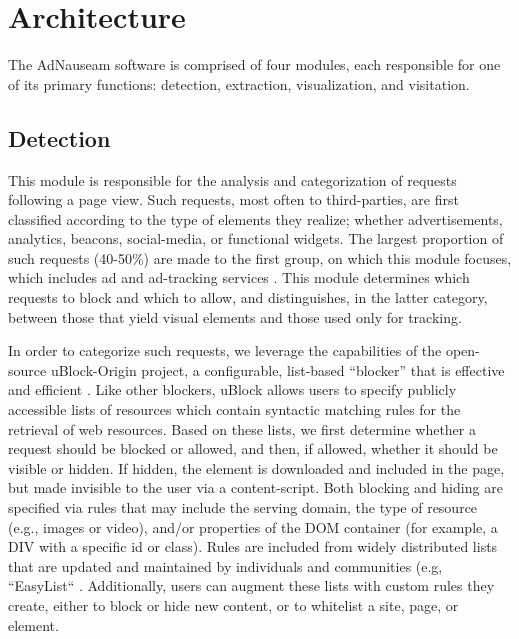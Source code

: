\documentclass[conference]{IEEEtran}
\begin{document}
\section{Architecture}

The AdNauseam software is comprised of four modules, each responsible for one of its primary functions: detection, extraction, visualization, and visitation.

\subsection{Detection}

This module is responsible for the analysis and categorization of requests following a page view. Such requests, most often to third-parties, are first classified according to the type of elements they realize; whether advertisements, analytics, beacons, social-media, or functional widgets. The largest proportion of such requests (40-50\%) are made to the first group, on which this module focuses, which includes ad and ad-tracking services \cite{Wills}. This module determines which requests to block and which to allow, and distinguishes, in the latter category, between those that yield visual elements and those used only for tracking.

In order to categorize such requests, we leverage the capabilities of the open-source uBlock-Origin \cite{Gorhill} project, a configurable, list-based “blocker” that is effective and efficient \cite{Wills}. Like other blockers, uBlock allows users to specify publicly accessible lists of resources which contain syntactic matching rules for the retrieval of web resources. Based on these lists, we first determine whether a request should be blocked or allowed, and then, if allowed, whether it should be visible or hidden. If hidden, the element is downloaded and included in the page, but made invisible to the user via a content-script. Both blocking and hiding are specified via rules that may include the serving domain, the type of resource (e.g., images or video), and/or properties of the DOM container (for example, a DIV with a specific id or class). Rules are included from widely distributed lists that are updated and maintained by individuals and communities (e.g, “EasyList“ \cite{EasyList}. Additionally, users can augment these lists with custom rules they create, either to block or hide new content, or to whitelist a site, page, or element.
\end{document}
